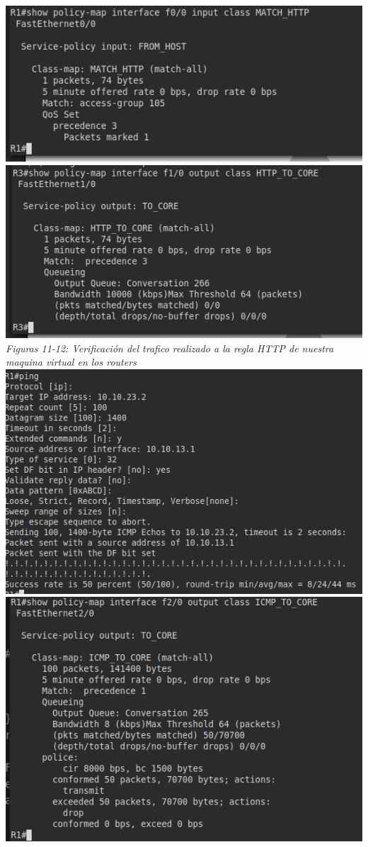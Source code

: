 \documentclass[10pt]{article}
\begin{document}
\begin{center}
  \includegraphics[scale=0.5]{imgs/11.png}\\
  \includegraphics[scale=0.5]{imgs/12.png}
  \\\textit{Figuras 11-12: Verificación del trafico realizado a la regla HTTP de nuestra maquina virtual en los routers}\\
  \includegraphics[scale=0.5]{imgs/13.png}\\
  \includegraphics[scale=0.5]{imgs/14.png}\\

\end{center}
\end{document}

